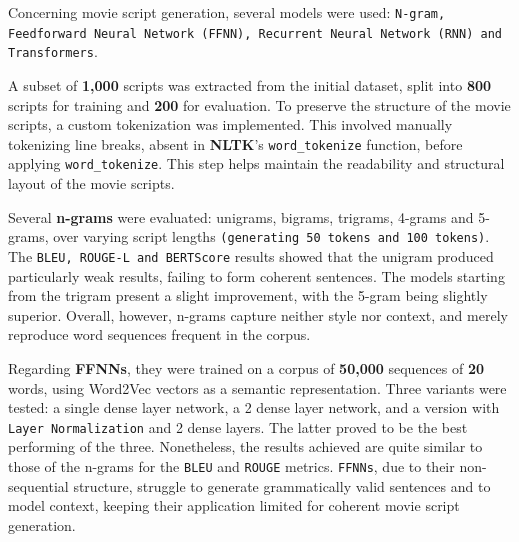 \documentclass[12pt]{report}
\begin{document}
\begin{table}[H]
\renewcommand{\arraystretch}{1.5}
\centering
{}
\caption{Scores of text generation models}
\label{tab:generation_scores}
\end{table}



Concerning movie script generation, several models were used: \texttt{N-gram, Feedforward Neural Network (FFNN), Recurrent Neural Network (RNN) and Transformers}. 

A subset of \textbf{1,000} scripts was extracted from the initial dataset, split into \textbf{800} scripts for training and \textbf{200} for evaluation. To preserve the structure of the movie scripts, a custom tokenization was implemented. This involved manually tokenizing line breaks, absent in \textbf{NLTK}'s \texttt{word\_tokenize} function, before applying \texttt{word\_tokenize}. This step helps maintain the readability and structural layout of the movie scripts. 

Several \textbf{n-grams} were evaluated: unigrams, bigrams, trigrams, 4-grams and 5-grams, over varying script lengths \texttt{(generating 50 tokens and 100 tokens)}. The \texttt{BLEU, ROUGE-L and BERTScore} results showed that the unigram produced particularly weak results, failing to form coherent sentences. The models starting from the trigram present a slight improvement, with the 5-gram being slightly superior. Overall, however, n-grams capture neither style nor context, and merely reproduce word sequences frequent in the corpus. 

Regarding \textbf{FFNNs}, they were trained on a corpus of \textbf{50,000} sequences of \textbf{20} words, using Word2Vec vectors as a semantic representation. Three variants were tested: a single dense layer network, a 2 dense layer network, and a version with \texttt{Layer Normalization} and 2 dense layers. The latter proved to be the best performing of the three. Nonetheless, the results achieved are quite similar to those of the n-grams for the \texttt{BLEU} and \texttt{ROUGE} metrics. \texttt{FFNNs}, due to their non-sequential structure, struggle to generate grammatically valid sentences and to model context, keeping their application limited  for coherent movie script generation. 
\end{document}
